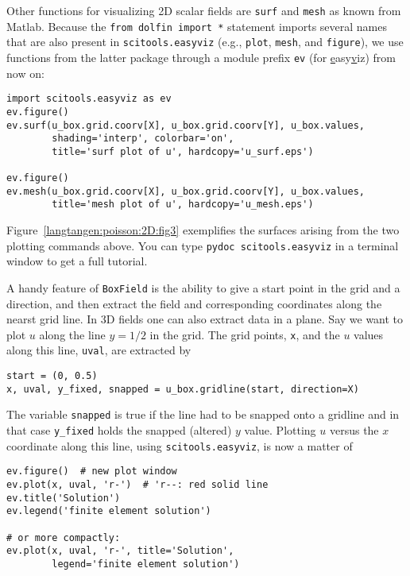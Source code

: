 Other functions for visualizing 2D scalar fields are {\fontsize{12pt}{12pt}\texttt{surf}} and
{\fontsize{12pt}{12pt}\texttt{mesh}} as known from Matlab. Because the {\fontsize{12pt}{12pt}\texttt{from dolfin import *}}
statement imports several names that are also present
in {\fontsize{12pt}{12pt}\texttt{scitools.easyviz}} (e.g., {\fontsize{12pt}{12pt}\texttt{plot}}, {\fontsize{12pt}{12pt}\texttt{mesh}}, and 
{\fontsize{12pt}{12pt}\texttt{figure}}), we use functions from the latter package through a
module prefix {\fontsize{12pt}{12pt}\texttt{ev}} (for \underline{e}asy\underline{v}iz) from now on:
\begin{Verbatim}[fontsize=\fontsize{10pt}{10pt},tabsize=8,baselinestretch=1.05,
fontfamily=tt,xleftmargin=7mm]
import scitools.easyviz as ev
ev.figure()
ev.surf(u_box.grid.coorv[X], u_box.grid.coorv[Y], u_box.values,
        shading='interp', colorbar='on', 
        title='surf plot of u', hardcopy='u_surf.eps')

ev.figure()
ev.mesh(u_box.grid.coorv[X], u_box.grid.coorv[Y], u_box.values,
        title='mesh plot of u', hardcopy='u_mesh.eps')
\end{Verbatim}
\noindent
Figure~\ref{langtangen:poisson:2D:fig3} exemplifies the surfaces arising from
the two plotting commands above.
You can type
{\fontsize{12pt}{12pt}\texttt{pydoc scitools.easyviz}} in a terminal window
to get a full tutorial.

A handy feature of {\fontsize{12pt}{12pt}\texttt{BoxField}} is the ability to give a start point
in the grid and a direction, and then extract the field and corresponding
coordinates along the nearst grid
line. In 3D fields
one can also extract data in a plane.
Say we
want to plot $u$ along the line $y=1/2$ in the grid. The grid points,
{\fontsize{12pt}{12pt}\texttt{x}}, and the
$u$ values along this line, {\fontsize{12pt}{12pt}\texttt{uval}}, are extracted by
\begin{Verbatim}[fontsize=\fontsize{10pt}{10pt},tabsize=8,baselinestretch=1.05,
fontfamily=tt,xleftmargin=7mm]
start = (0, 0.5)
x, uval, y_fixed, snapped = u_box.gridline(start, direction=X)
\end{Verbatim}
\noindent
The variable {\fontsize{12pt}{12pt}\texttt{snapped}} is true if the line had to be snapped onto a
gridline and in that case {\fontsize{12pt}{12pt}\verb!y_fixed!} holds the snapped 
(altered) $y$ value.
Plotting $u$ versus the $x$ coordinate along this line, using
{\fontsize{12pt}{12pt}\texttt{scitools.easyviz}}, is now a matter of
\begin{Verbatim}[fontsize=\fontsize{10pt}{10pt},tabsize=8,baselinestretch=1.05,
fontfamily=tt,xleftmargin=7mm]
ev.figure()  # new plot window
ev.plot(x, uval, 'r-')  # 'r--: red solid line
ev.title('Solution')
ev.legend('finite element solution')

# or more compactly:
ev.plot(x, uval, 'r-', title='Solution',
        legend='finite element solution')
\end{Verbatim}
\noindent

